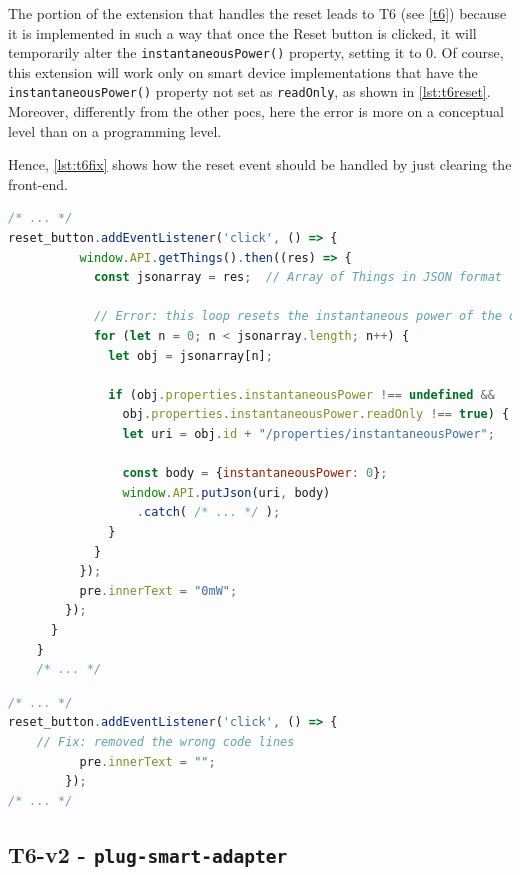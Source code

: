 The portion of the extension that handles the reset leads to T6 (see \autoref{t6}) because it is implemented in such a way that once the Reset button is clicked, it  will temporarily alter the \texttt{instantaneousPower()} property, setting it to $0$. Of course, this extension will work only on smart device implementations that have the \texttt{instantaneousPower()} property not set as \texttt{readOnly}, as shown in \autoref{lst:t6reset}. Moreover, differently from the other \glspl{poc}, here the error is more on a conceptual level than on a programming level.

Hence, \autoref{lst:t6fix} shows how the reset event should be handled by just clearing the front-end.

\begin{lstlisting}[language=JavaScript, label=lst:t6reset, caption=T6-v1 - Reset Event]
/* ... */
reset_button.addEventListener('click', () => {
          window.API.getThings().then((res) => {
            const jsonarray = res;  // Array of Things in JSON format

            // Error: this loop resets the instantaneous power of the devices 
            for (let n = 0; n < jsonarray.length; n++) {
              let obj = jsonarray[n];
  
              if (obj.properties.instantaneousPower !== undefined &&
                obj.properties.instantaneousPower.readOnly !== true) {
                let uri = obj.id + "/properties/instantaneousPower";
  
                const body = {instantaneousPower: 0};
                window.API.putJson(uri, body)
                  .catch( /* ... */ );   
              }
            }
          });
          pre.innerText = "0mW";
        });
      }
    }
    /* ... */
\end{lstlisting}


\begin{lstlisting}[language=JavaScript, label=lst:t6fix, caption=T6-v1 - Fixed Reset]
/* ... */
reset_button.addEventListener('click', () => {
    // Fix: removed the wrong code lines
          pre.innerText = "";
        });
/* ... */
\end{lstlisting}



\subsection{T6-v2 - \texttt{plug-smart-adapter}}
\label{t62poc}

